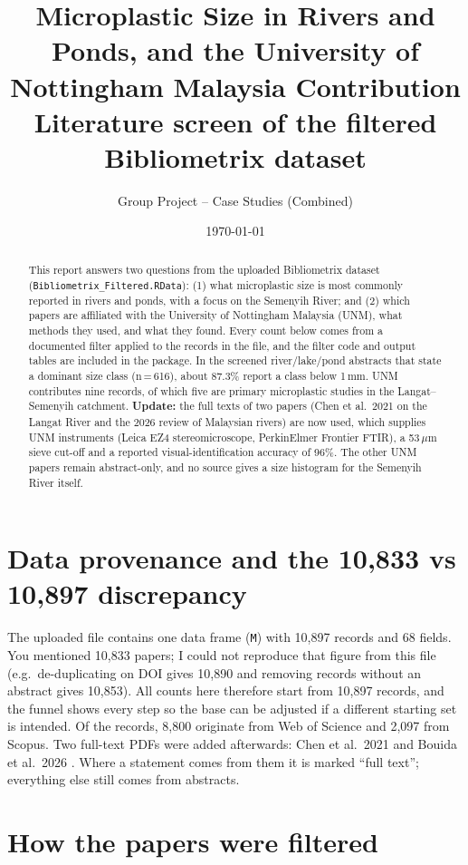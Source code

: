 \documentclass[11pt,a4paper]{article}
\title{\textbf{Microplastic Size in Rivers and Ponds, and the University of Nottingham Malaysia Contribution}\\[2pt]\large Literature screen of the filtered Bibliometrix dataset}
\author{Group Project -- Case Studies (Combined)}
\date{\today}
\newcommand{\um}{\,\ensuremath{\mu}m}
\newcommand{\flag}[1]{\textcolor{accent}{\textbf{#1}}}
\begin{document}
\maketitle

\begin{abstract}\noindent
This report answers two questions from the uploaded Bibliometrix dataset (\texttt{Bibliometrix\_\allowbreak Filtered.RData}): (1) what microplastic size is most commonly reported in rivers and ponds, with a focus on the Semenyih River; and (2) which papers are affiliated with the University of Nottingham Malaysia (UNM), what methods they used, and what they found. Every count below comes from a documented filter applied to the records in the file, and the filter code and output tables are included in the package. In the screened river/lake/pond abstracts that state a dominant size class (n\,=\,616), about 87.3\% report a class below 1\,mm. UNM contributes nine records, of which five are primary microplastic studies in the Langat--Semenyih catchment. \flag{Update:} the full texts of two papers (Chen et al.\ 2021 on the Langat River and the 2026 review of Malaysian rivers) are now used, which supplies UNM instruments (Leica EZ4 stereomicroscope, PerkinElmer Frontier FTIR), a 53\um{} sieve cut-off and a reported visual-identification accuracy of 96\%. The other UNM papers remain abstract-only, and no source gives a size histogram for the Semenyih River itself.
\end{abstract}

\section{Data provenance and the 10,833 vs 10,897 discrepancy}
The uploaded file contains one data frame (\texttt{M}) with 10,897 records and 68 fields. You mentioned 10,833 papers; I could not reproduce that figure from this file (e.g.\ de-duplicating on DOI gives 10,890 and removing records without an abstract gives 10,853). All counts here therefore start from 10,897 records, and the funnel shows every step so the base can be adjusted if a different starting set is intended. Of the records, 8,800 originate from Web of Science and 2,097 from Scopus. Two full-text PDFs were added afterwards: Chen et al.\ 2021 \cite{chen21a} and Bouida et al.\ 2026 \cite{bouida26}. Where a statement comes from them it is marked ``full text''; everything else still comes from abstracts.

\section{How the papers were filtered}
\end{document}
